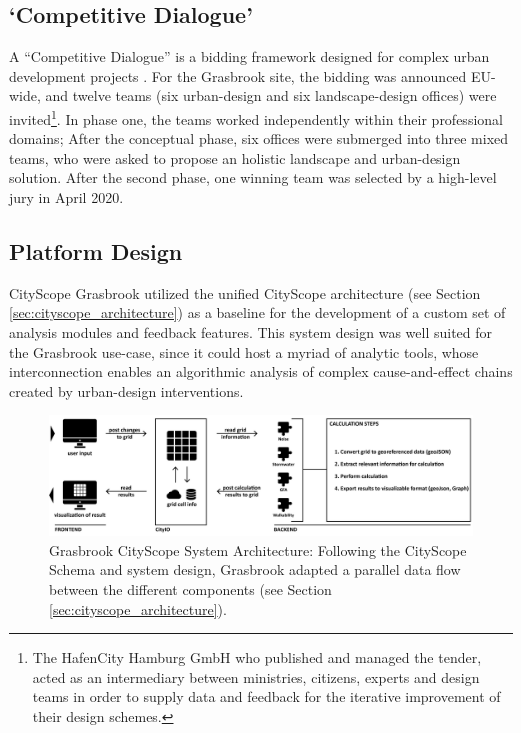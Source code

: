 {    \subsection{`Competitive Dialogue'}
    {
        A ``Competitive Dialogue'' is a bidding framework designed for complex urban development projects \cite{hpg15}. For the Grasbrook site, the bidding was announced EU-wide, and twelve teams (six urban-design and six landscape-design offices) were invited\footnote{The HafenCity Hamburg GmbH who published and managed the tender, acted as an intermediary between ministries, citizens, experts and design teams in order to supply data and feedback for the iterative improvement of their design schemes.}. In phase one, the teams worked independently within their professional domains; After the conceptual phase, six offices were submerged into three mixed teams, who were asked to propose an holistic landscape and urban-design solution. After the second phase, one winning team was selected by a high-level jury in April 2020.
    }



    \subsection{Platform Design}

    {
        CityScope Grasbrook utilized the unified CityScope architecture (see Section \eqref{sec:cityscope_architecture}) as a baseline for the development of a custom set of analysis modules and feedback features. This system design was well suited for the Grasbrook use-case, since it could host a myriad of analytic tools, whose interconnection enables an algorithmic analysis of complex cause-and-effect chains created by urban-design interventions.

        \begin{figure}[!htb]
            \begin{center}
                \includegraphics[width=1\textwidth]{chapters/transformation/grasbrook/figures/grsbrk3.jpg}
            \end{center}
            \caption{Grasbrook CityScope System Architecture: Following the CityScope Schema and system design, Grasbrook adapted a parallel data flow between the different components (see Section \eqref{sec:cityscope_architecture}).}
            \label{fig:grasbrook_architecture}
        \end{figure}

}}
